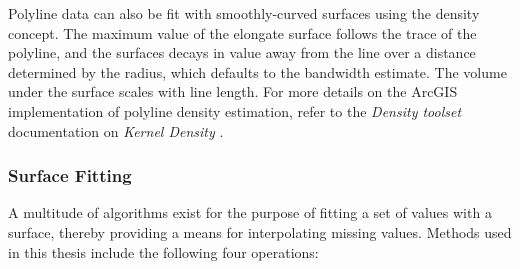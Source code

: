 Polyline data can also be fit with smoothly-curved surfaces using the density concept. The maximum value of the elongate surface follows the trace of the polyline, and the surfaces decays in value away from the line over a distance determined by the radius, which defaults to the bandwidth estimate. The volume under the surface scales with line length. For more details on the ArcGIS implementation of polyline density estimation, refer to the \textit{Density toolset} documentation on \textit{Kernel Density} \citep{esri_kernel_2021}.

\subsubsection{Surface Fitting}\label{ch3:surface_fit}
A multitude of algorithms exist for the purpose of fitting a set of values with a surface, thereby providing a means for interpolating missing values. Methods used in this thesis include the following four operations:


